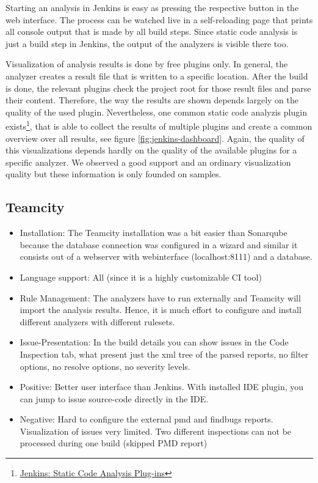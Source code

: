 \documentclass[conference]{IEEEtran}
\begin{document}
Starting an analysis in Jenkins is easy as pressing the respective button in the web interface. The process can be watched live in a self-reloading page that prints all console output that is made by all build steps. Since static code analysis is just a build step in Jenkins, the output of the analyzers is visible there too.

Visualization of analysis results is done by free plugins only. In general, the analyzer creates a result file that is written to a specific location. After the build is done, the relevant plugins check the project root for those result files and parse their content. Therefore, the way the results are shown depends largely on the quality of the used plugin. Nevertheless, one common static code analyzis plugin exists\footnote{\href{https://wiki.jenkins-ci.org/display/JENKINS/Static+Code+Analysis+Plug-ins}{Jenkins: Static Code Analysis Plug-ins}}, that is able to collect the results of multiple plugins and create a common overview over all results, see figure \ref{fig:jenkins-dashboard}. Again, the quality of this visualizations depends hardly on the quality of the available plugins for a specific analyzer. We observed a good support and an ordinary visualization quality but these information is only founded on samples.




\subsection{Teamcity}
\label{subsec:evaluation_teamcity}

\begin{itemize}
	\item Installation: The Teamcity installation was a bit easier than Sonarqube because the database connection was configured in a wizard and similar it consists out of a webserver with webinterface (localhost:8111) and a database.
	
	\item Language support: All (since it is a highly customizable CI tool)
	
	\item Rule Management: The analyzers have to run externally and Teamcity will import the analysis results.
	Hence, it is much effort to configure and install different analyzers with different rulesets.
	
	\item Issue-Presentation: In the build details you can show issues in the Code Inspection tab, what present just the xml tree of the parsed reports, no filter options, no resolve options, no severity levels.
	
	\item Positive: Better user interface than Jenkins. With installed IDE plugin, you can jump to issue source-code directly in the IDE. 
	
	\item Negative: Hard to configure the external pmd and findbugs reports. Visualization of issues very limited. Two different inspections can not be processed during one build (skipped PMD report)
	
\end{itemize}
\end{document}
